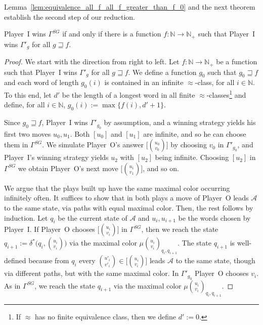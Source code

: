\documentclass[fleqn,envcountsame]{LMCS}
\newcommand{\aut}[1]{\ensuremath{\mathcal{#1}}}
\newcommand{\pI}{Player~I\xspace}
\newcommand{\pO}{Player~O\xspace}
\newcommand{\GSG}{\ensuremath{\Gamma^{SG}}\xspace}
\newcommand{\Gp}[1]{\ensuremath{\Gamma'_{#1}}\xspace}
\newcommand{\Nat}{\ensuremath{\mathbb{N}}\xspace}
\newcommand{\Natp}{\ensuremath{\mathbb{N}_+}\xspace}
\let\obinom\binom
\renewcommand\binom[2]{
  \Big( { {{#1}} \atop {{#2}} } \Big)
}
\begin{document}
Lemma~\ref{lem:equivalence_all_f_all_f_greater_than_f_0} and the next
theorem establish the second step of our reduction.

\begin{thm}\label{thm:equivalence_all_f_greater_than_f_0_GSG}
\pI wins \GSG if and only if there is a function $f:\Nat\to\Natp$ such that
\pI wins \Gp{g} for all $g\sqsupseteq f$.
\end{thm}

\begin{proof}
We start with the direction from right to left. Let $f:\Nat\to\Natp$
be a function such that \pI wins \Gp{g} for all $g\sqsupseteq f$. We
define a function $g_0$ such that $g_0\sqsupseteq f$ and each word of
length $g_0(i)$ is contained in an infinite $\approx$-class, for all $i\in\Nat$.
To this end, let $d'$ be the length of a longest word in all finite
$\approx$-classes\footnote{If $\approx$ has no finite
equivalence class, then we define $d':=0$.} and define, for all $i\in\Nat$,
$g_0(i):=\max\{f(i),d'+1\}$.

Since $g_0\sqsupseteq f$, \pI wins \Gp{g_0} by assumption, and a winning strategy yields his first
two moves $u_0,u_1$. Both $[u_0]$ and $[u_1]$ are infinite, and so he can
choose them in \GSG. We simulate \pO's answer $\big[\obinom{u_0}{v_0}\big]$
by choosing $v_0$ in \Gp{g_0}, and \pI's winning strategy yields $u_2$ with $[u_2]$ being
infinite. Choosing $[u_2]$ in \GSG we obtain \pO's next move
$\big[\obinom{u_1}{v_1}\big]$, and so on.

We argue that the plays built up have the same maximal color occurring
infinitely often. It suffices to show that in both plays a move of \pO
leads \aut{A} to the same state, via paths with equal maximal
color. Then, the rest follows by induction. Let $q_i$ be the current
state of \aut{A} and $u_i,u_{i+1}$ be the words chosen by \pI. If \pO
chooses $\big[\obinom{u_i}{v_i}\big]$ in \GSG, then we reach the state
$q_{i+1}:=\delta^*\big(q_i,\obinom{u_i}{v_i}\big)$
via the maximal color
$\mu\obinom{u_i}{v_i}_{q_i,q_{i+1}}$. The state $q_{i+1}$ is well-defined
because from $q_i$ every $\obinom{u'_i}{v'_i} \in \big[\obinom{u_i}{v_i}\big]$
leads \aut{A} to the same state, though via different paths, but with the
same maximal color. In \Gp{g_0} \pO chooses $v_i$. As in \GSG, we reach
the state $q_{i+1}$ via the maximal color
$\mu\obinom{u_i}{v_i}_{q_i,q_{i+1}}$.


\end{proof}
\end{document}
